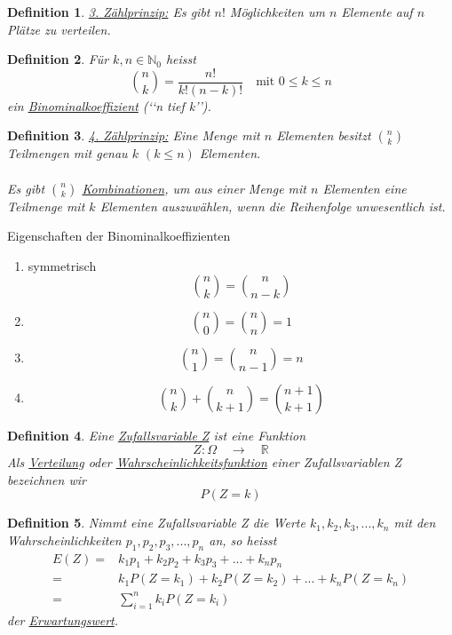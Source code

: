 \documentclass{article}
\newtheorem{mydef}{Definition}
\begin{document}
\begin{mydef}
\underline{3. Zählprinzip:} Es gibt $n!$ Möglichkeiten um $n$ Elemente auf $n$ Plätze zu verteilen.
\end{mydef}
\begin{mydef}
Für $k, n \in \mathbb{N}_{0}$ heisst
\begin{equation}
\binom{n}{k} = \frac{n!}{k!(n-k)!} \quad \mbox{mit } 0 \leq k \leq n
\end{equation}
ein \underline{Binominalkoeffizient} (\lq\lq{}n tief k\rq\rq{}).
\end{mydef}
\begin{mydef}
\underline{4. Zählprinzip:} Eine Menge mit $n$ Elementen besitzt $\binom{n}{k}$ Teilmengen mit genau $k$ $(k \leq n)$ Elementen.\\\\
Es gibt $\binom{n}{k}$ \underline{Kombinationen}, um aus einer Menge mit $n$ Elementen eine Teilmenge mit $k$ Elementen auszuwählen, wenn die Reihenfolge unwesentlich ist.
\end{mydef}
Eigenschaften der Binominalkoeffizienten
\begin{enumerate}
\item
symmetrisch
\begin{equation}
\binom{n}{k} = \binom{n}{n-k}
\end{equation}
\item
\begin{equation}
\binom{n}{0} = \binom{n}{n} = 1
\end{equation}
\item
\begin{equation}
\binom{n}{1} = \binom{n}{n-1} = n
\end{equation}
\item
\begin{equation}
\binom{n}{k} + \binom{n}{k+1} = \binom{n+1}{k+1}
\end{equation}
\end{enumerate}
\begin{mydef}
Eine \underline{Zufallsvariable Z} ist eine Funktion
\begin{equation}
Z: \Omega \quad \longrightarrow \quad \mathbb{R}
\end{equation}
Als \underline{Verteilung} oder \underline{Wahrscheinlichkeitsfunktion} einer Zufallsvariablen Z bezeichnen wir
\begin{equation}
P(Z=k)
\end{equation}
\end{mydef}
\begin{mydef}
Nimmt eine Zufallsvariable Z die Werte $k_1, k_2, k_3, ..., k_n$ mit den Wahrscheinlichkeiten $p_1, p_2, p_3, ..., p_n$ an, so heisst
\begin{align*}
E(Z) = & k_1p_1 + k_2p_2 + k_3p_3 + ... + k_np_n\\
= & k_1 P(Z=k_1) + k_2 P(Z=k_2) + ... + k_n P(Z=k_n)\\
= & \sum_{i=1}^n{k_i P(Z=k_i)}
\end{align*}
der \underline{Erwartungswert}.
\end{mydef}
\end{document}
